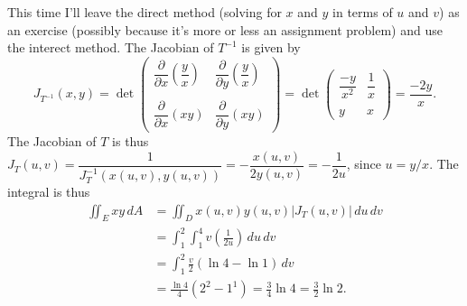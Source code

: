 \documentclass[12pt,letterpaper]{article}
\begin{document}
\begin{enumerate}
This time I'll leave the direct method (solving for $x$ and $y$ in terms of $u$ and $v$) as an exercise (possibly because it's more or less an assignment problem) and use the interect method. The Jacobian of $T^{-1}$ is given by
\[
J_{T^{-1}}(x,y) = \det\begin{pmatrix}
\dfrac{\partial}{\partial x}\left(\dfrac{y}{x}\right)&\dfrac{\partial }{\partial y}\left(\dfrac{y}{x}\right)\\ & \\ \dfrac{\partial }{\partial x}(xy)& \dfrac{\partial }{\partial y}(xy)
\end{pmatrix} = \det\begin{pmatrix}
\dfrac{-y}{x^2}&\dfrac{1}{x}\\ & \\ y & x
\end{pmatrix} = \dfrac{-2y}{x}.
\]
The Jacobian of $T$ is thus $J_T(u,v) = \dfrac{1}{J_T^{-1}(x(u,v),y(u,v))} = -\dfrac{x(u,v)}{2y(u,v)} = -\dfrac{1}{2u}$, since $u=y/x$. The integral is thus
\begin{align*}
\iint_E xy\, dA & = \iint_D x(u,v)y(u,v)\lvert J_T(u,v)\rvert \,du\,dv\\
& = \int_1^2\int_1^4 v\left(\frac{1}{2u}\right)\,du\,dv\\
& = \int_1^2 \frac{v}{2}(\ln 4-\ln 1)\,dv\\
& = \frac{\ln 4}{4}(2^2-1^1) = \frac{3}{4}\ln 4=\frac{3}{2}\ln 2.
\end{align*}
\end{enumerate}
\end{document}
